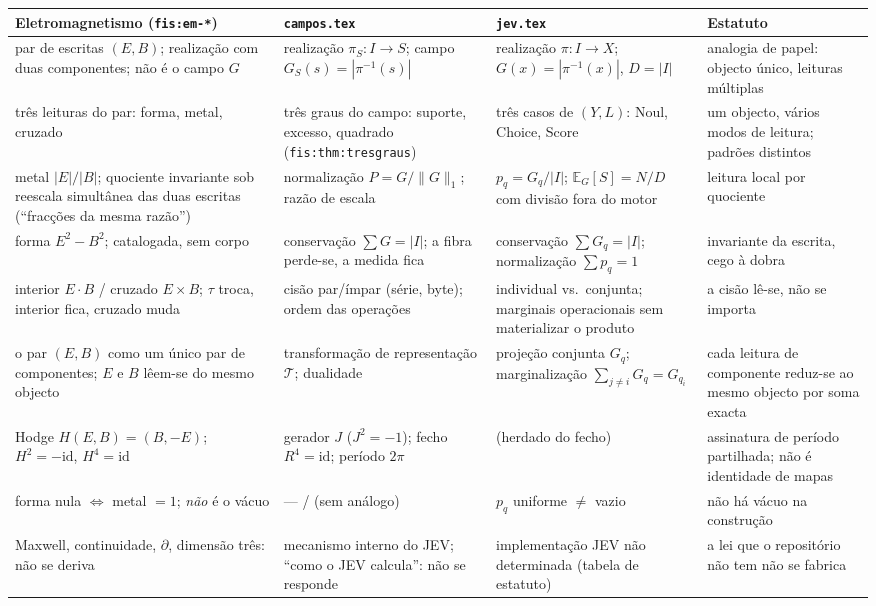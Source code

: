 \documentclass[11pt,a4paper]{article}
\newcommand{\abs}[1]{\lvert #1\rvert}
\begin{document}
\begin{center}\small
\begin{tabular}{@{}p{}p{}p{}p{}@{}}
\toprule
\textbf{Eletromagnetismo} (\texttt{fis:em-*}) & \texttt{campos.tex} & \texttt{jev.tex} & \textbf{Estatuto} \\
\midrule
par de escritas $(E,B)$; realização com duas componentes; não é o campo $G$
  & realização $\pi_S\colon I\to S$; campo $G_S(s)=|\pi^{-1}(s)|$
  & realização $\pi\colon I\to X$; $G(x)=|\pi^{-1}(x)|$, $D=|I|$
  & analogia de papel: objecto único, leituras múltiplas \\
três leituras do par: forma, metal, cruzado
  & três graus do campo: suporte, excesso, quadrado (\texttt{fis:thm:tresgraus})
  & três casos de $(Y,L)$: Noul, Choice, Score
  & um objecto, vários modos de leitura; padrões distintos \\
metal $\abs{E}/\abs{B}$; quociente invariante sob reescala simultânea das duas escritas (``fracções da mesma razão'')
  & normalização $P=G/\lVert G\rVert_1$; razão de escala
  & $p_q=G_q/|I|$; $\mathbb E_G[S]=N/D$ com divisão fora do motor
  & leitura local por quociente \\
forma $E^{2}-B^{2}$; catalogada, sem corpo
  & conservação $\sum G=|I|$; a fibra perde-se, a medida fica
  & conservação $\sum G_q=|I|$; normalização $\sum p_q=1$
  & invariante da escrita, cego à dobra \\
interior $E\cdot B$ / cruzado $E\times B$; $\tau$ troca, interior fica, cruzado muda
  & cisão par/ímpar (série, byte); ordem das operações
  & individual vs.\ conjunta; marginais operacionais sem materializar o produto
  & a cisão lê-se, não se importa \\
o par $(E,B)$ como um único par de componentes; $E$ e $B$ lêem-se do mesmo objecto
  & transformação de representação $\mathcal T$; dualidade
  & projeção conjunta $G_q$; marginalização $\sum_{j\neq i}G_q=G_{q_i}$
  & cada leitura de componente reduz-se ao mesmo objecto por soma exacta \\
Hodge $H(E,B)=(B,-E)$; $H^{2}=-\mathrm{id}$, $H^{4}=\mathrm{id}$
  & gerador $J$ ($J^{2}=-1$); fecho $R^{4}=\mathrm{id}$; período $2\pi$
  & (herdado do fecho)
  & assinatura de período partilhada; não é identidade de mapas \\
forma nula $\iff$ metal $=1$; \emph{não} é o vácuo
  & --- / (sem análogo)
  & $p_q$ uniforme $\neq$ vazio
  & não há vácuo na construção \\
Maxwell, continuidade, $\partial$, dimensão três: não se deriva
  & mecanismo interno do JEV; ``como o JEV calcula'': não se responde
  & implementação JEV não determinada (tabela de estatuto)
  & a lei que o repositório não tem não se fabrica \\
\bottomrule
\end{tabular}
\end{center}
\end{document}
